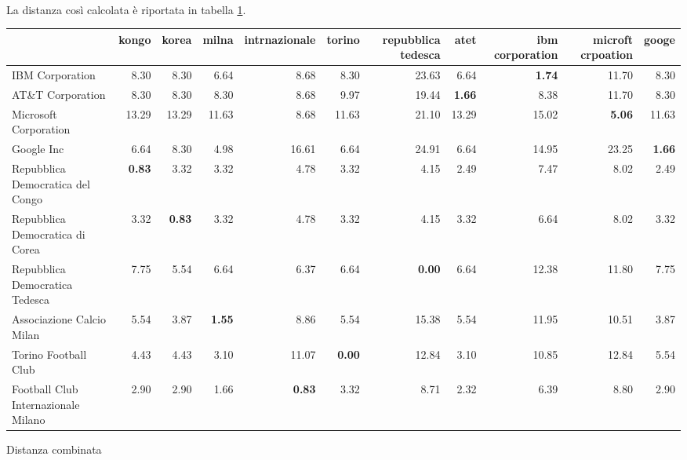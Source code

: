 \documentclass[a4paper,12pt,openany,oneside]{article}
\begin{document}
\\[1.8em]
La distanza così calcolata è riportata in tabella \ref{table:combined}.
\\[1.8em]
\begin{table}[ht]
	\centering	
	\tiny
	\setlength{\tabcolsep}{0.8em}
	\begin{tabularx}{1.02\textwidth}{l | rrrrrrrrrr}
		{} & {kongo} & {korea} & {milna} & {intrnazionale} & {torino} & {repubblica tedesca} & {atet} & {ibm corporation} & {microft crpoation} & {googe} \\
		\midrule
		{IBM Corporation} & {8.30} & {8.30} & {6.64} & {8.68} & {8.30} & {23.63} & {6.64} & \textcolor[HTML]{388E3C}{\textbf{1.74}} & {11.70} & {8.30} \\
		{AT\&T Corporation} & {8.30} & {8.30} & {8.30} & {8.68} & {9.97} & {19.44} & \textcolor[HTML]{388E3C}{\textbf{1.66}} & {8.38} & {11.70} & {8.30} \\
		{Microsoft Corporation} & {13.29} & {13.29} & {11.63} & {8.68} & {11.63} & {21.10} & {13.29} & {15.02} & \textcolor[HTML]{388E3C}{\textbf{5.06}} & {11.63} \\
		{Google Inc} & {6.64} & {8.30} & {4.98} & {16.61} & {6.64} & {24.91} & {6.64} & {14.95} & {23.25} & \textcolor[HTML]{388E3C}{\textbf{1.66}} \\
		{Repubblica Democratica del Congo} & \textcolor[HTML]{388E3C}{\textbf{0.83}} & {3.32} & {3.32} & {4.78} & {3.32} & {4.15} & {2.49} & {7.47} & {8.02} & {2.49} \\
		{Repubblica Democratica di Corea} & {3.32} & \textcolor[HTML]{388E3C}{\textbf{0.83}} & {3.32} & {4.78} & {3.32} & {4.15} & {3.32} & {6.64} & {8.02} & {3.32} \\
		{Repubblica Democratica Tedesca} & {7.75} & {5.54} & {6.64} & {6.37} & {6.64} & \textcolor[HTML]{388E3C}{\textbf{0.00}} & {6.64} & {12.38} & {11.80} & {7.75} \\
		{Associazione Calcio Milan} & {5.54} & {3.87} & \textcolor[HTML]{388E3C}{\textbf{1.55}} & {8.86} & {5.54} & {15.38} & {5.54} & {11.95} & {10.51} & {3.87} \\
		{Torino Football Club} & {4.43} & {4.43} & {3.10} & {11.07} & \textcolor[HTML]{388E3C}{\textbf{0.00}} & {12.84} & {3.10} & {10.85} & {12.84} & {5.54} \\
		{Football Club Internazionale Milano} & {2.90} & {2.90} & {1.66} & \textcolor[HTML]{388E3C}{\textbf{0.83}} & {3.32} & {8.71} & {2.32} & {6.39} & {8.80} & {2.90} \\
	\end{tabularx}
	 {Distanza combinata}
	\label{table:combined}
\end{table}
\end{document}
